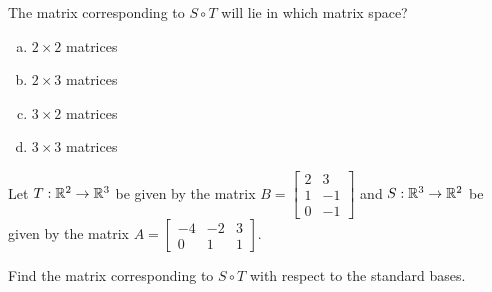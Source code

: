 \begin{applicationActivities}{1}{21}
\begin{activity}{3}
The matrix corresponding to $S \circ T$ will lie in which matrix space?
\begin{enumerate}[(a)]
\item $2 \times 2$ matrices
\item $2 \times 3$ matrices
\item $3 \times 2$ matrices
\item $3 \times 3$ matrices
\end{enumerate}
\end{activity}

%

\begin{activity}{10}
Let $T: \mathbb{R}^2 \rightarrow \mathbb{R}^3$ be given by the matrix $B=\begin{bmatrix} 2 & 3 \\ 1 & -1 \\ 0 & -1 \end{bmatrix}$ and $S: \mathbb{R}^3 \rightarrow \mathbb{R}^2$ be given by the matrix $A=\begin{bmatrix} -4 & -2 & 3 \\ 0 & 1 & 1 \end{bmatrix}$.

Find the matrix corresponding to $S \circ T$ with respect to the standard bases.
\end{activity}


\end{applicationActivities}

